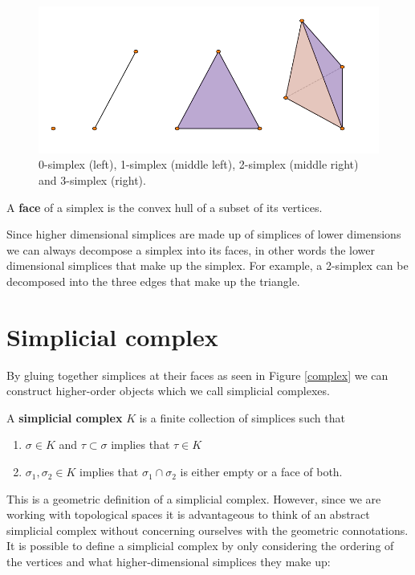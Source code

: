 \begin{figure}
  \centering
  \includegraphics[]{simplex.pdf}
  \caption{
  \label{simplices}
0-simplex (left), 1-simplex (middle left), 2-simplex (middle right) and 3-simplex (right).}
  \end{figure}
\begin{definition}
A \textbf{face} of a simplex is the convex hull of a subset of its vertices.
\end{definition}
Since higher dimensional simplices are made up of simplices of lower dimensions we can always decompose a simplex into its faces, in other words the lower dimensional simplices that make up the simplex. For example, a 2-simplex can be decomposed into the three edges that make up the triangle.
\section{Simplicial complex}
By gluing together simplices at their faces as seen in Figure \ref{complex} we can construct higher-order objects which we call simplicial complexes.
\begin{definition}
A \textbf{simplicial complex} $K$ is a finite collection of simplices such that

\begin{enumerate}
    \item $\sigma \in K$ and $\tau \subset \sigma$ implies that $\tau \in K$
    \item $\sigma_{1}, \sigma_{2} \in K$ implies that $\sigma_{1} \cap \sigma_{2}$ is either empty or a face of both.
\end{enumerate}

\end{definition}
This is a geometric definition of a simplicial complex. However, since we are working with topological spaces it is advantageous to think of an abstract simplicial complex without concerning ourselves with the geometric connotations. It is possible to define a simplicial complex by only considering the ordering of the vertices and what higher-dimensional simplices they make up:

